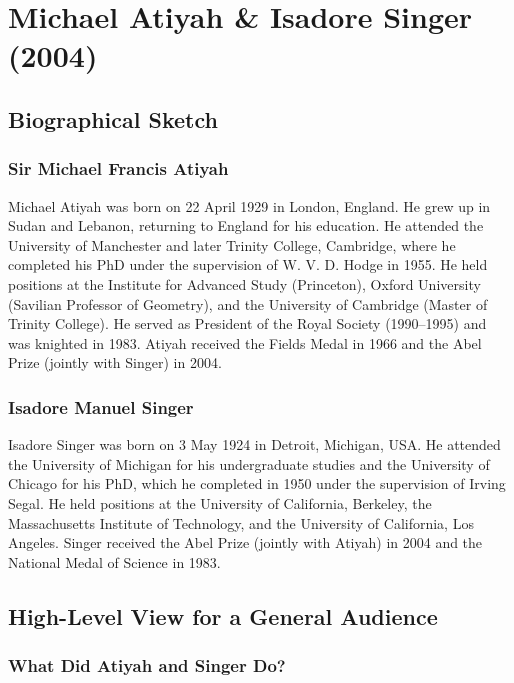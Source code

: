 \chapter{Michael Atiyah \& Isadore Singer (2004)}

\section{Biographical Sketch}



\subsection{Sir Michael Francis Atiyah}

Michael Atiyah was born on 22 April 1929 in London, England. He grew up in Sudan and Lebanon, returning to England for his education. He attended the University of Manchester and later Trinity College, Cambridge, where he completed his PhD under the supervision of W. V. D. Hodge in 1955. He held positions at the Institute for Advanced Study (Princeton), Oxford University (Savilian Professor of Geometry), and the University of Cambridge (Master of Trinity College). He served as President of the Royal Society (1990--1995) and was knighted in 1983. Atiyah received the Fields Medal in 1966 and the Abel Prize (jointly with Singer) in 2004.

\subsection{Isadore Manuel Singer}

Isadore Singer was born on 3 May 1924 in Detroit, Michigan, USA. He attended the University of Michigan for his undergraduate studies and the University of Chicago for his PhD, which he completed in 1950 under the supervision of Irving Segal. He held positions at the University of California, Berkeley, the Massachusetts Institute of Technology, and the University of California, Los Angeles. Singer received the Abel Prize (jointly with Atiyah) in 2004 and the National Medal of Science in 1983.

\section{High-Level View for a General Audience}

\subsection{What Did Atiyah and Singer Do?}

